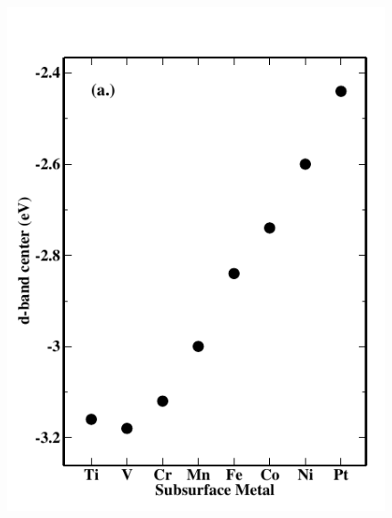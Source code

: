 \documentclass[aps,preprint,superscriptaddress,endfloats*]{revtex4}
\begin{document}
\begin{figure}
\subfigure%
{
\label{fig1a}
\includegraphics{figures/figure_1a}
}
\hspace{0cm}

\end{figure}
\end{document}
